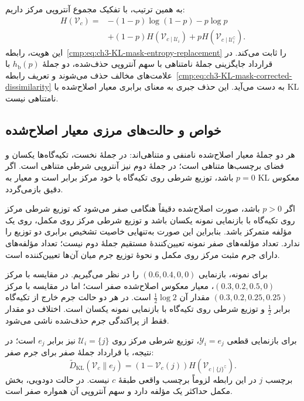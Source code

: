 به همین ترتیب، با تفکیک مجموع آنتروپی مرکز داریم:
\[
\begin{aligned}
H(\mathcal V_c)
={}&-(1-p)\log(1-p)-p\log p\\
&+(1-p)H(\mathcal V_{c\mid\mathcal U_i})
+pH(\mathcal V_{c\mid\mathcal U_i^{\complement}}).
\end{aligned}
\]
این هویت، رابطه~\eqref{cmp:eq:ch3-KL-mask-entropy-replacement}
را ثابت می‌کند. در قرارداد جایگزینی جملهٔ نامتناهی
با سهم آنتروپی حذف‌شده، دو جملهٔ $h_{\mathrm b}(p)$
با علامت‌های مخالف حذف می‌شوند و تعریف
رابطه~\eqref{cmp:eq:ch3-KL-mask-corrected-dissimilarity}
به دست می‌آید. این حذف جبری به معنای برابری معیار
اصلاح‌شده با KL نامتناهی نیست.

\subsection{خواص و حالت‌های مرزی معیار اصلاح‌شده}
هر دو جملهٔ معیار اصلاح‌شده نامنفی و متناهی‌اند:
در جملهٔ نخست، تکیه‌گاه‌ها یکسان و فضای برچسب‌ها
متناهی است؛ در جملهٔ دوم نیز آنتروپی شرطی متناهی
است. اگر $p=0$ باشد، توزیع شرطی روی تکیه‌گاه با
خود مرکز برابر است و معیار به KL معکوس دقیق
بازمی‌گردد.

اگر $p>0$ باشد، صورت اصلاح‌شده دقیقاً هنگامی صفر
می‌شود که توزیع شرطی مرکز روی تکیه‌گاه با بازنمایی
نمونه یکسان باشد و توزیع شرطی مرکز روی مکمل، روی
یک مؤلفه متمرکز باشد. بنابراین این صورت به‌تنهایی
خاصیت تشخیص برابری دو توزیع را ندارد. تعداد مؤلفه‌های
صفر نمونه تعیین‌کنندهٔ مستقیم جملهٔ دوم نیست؛
تعداد مؤلفه‌های دارای جرم مثبت مرکز روی مکمل و
نحوهٔ توزیع جرم میان آن‌ها تعیین‌کننده است.

برای نمونه، بازنمایی $(0.6,0.4,0,0)$ را در نظر
می‌گیریم. در مقایسه با مرکز $(0.3,0.2,0.5,0)$،
معیار معکوس اصلاح‌شده صفر است؛ اما در مقایسه با
مرکز $(0.3,0.2,0.25,0.25)$ مقدار آن $\tfrac12\log2$
است. در هر دو حالت جرم خارج از تکیه‌گاه برابر
$\tfrac12$ و توزیع شرطی روی تکیه‌گاه با بازنمایی
نمونه یکسان است. اختلاف دو مقدار فقط از پراکندگی
جرم حذف‌شده ناشی می‌شود.

برای بازنمایی قطعی $\mathscr Y_i=e_j$، توزیع شرطی
مرکز روی $\mathcal U_i=\{j\}$ نیز برابر $e_j$ است؛
در نتیجه، با قرارداد جملهٔ صفر برای جرم صفر:
\begin{equation}\label{eq:app-geometry-KL-mask-onehot}
\widetilde D_{\mathrm{KL}}(\mathcal V_c\|e_j)
=(1-\mathcal V_c(j))H(\mathcal V_{c\mid\{j\}^{\complement}}).
\end{equation}
برچسب $j$ در این رابطه لزوماً برچسب واقعی طبقهٔ
$c$ نیست. در حالت دودویی، بخش مکمل حداکثر یک
مؤلفه دارد و سهم آنتروپی آن همواره صفر است.

